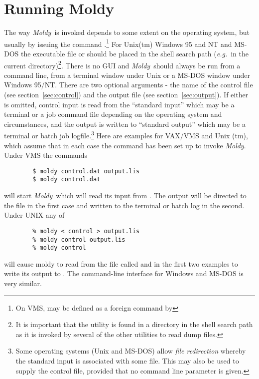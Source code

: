\documentclass[a4paper,twoside]{report}
\newcommand{\moldy}{\emph{Moldy}}
\newcommand{\eg}{\emph{e.g.}}
\begin{document}
\chapter{Running Moldy}  %

The way \moldy\ is invoked depends to some extent on the operating
system, but usually by issuing the command .\footnote{On
  VMS,  may be defined as a foreign command by } For Unix(tm) Windows 95 and NT
and MS-DOS the executable file  or 
should be placed in the shell search path (\eg\ in the current
directory)\footnote{It is important that the  utility
  is found in a directory in the shell search path as it is invoked by
  several of the other utilities to read dump files.}. There is no GUI
and \moldy\ should always be run from a command line, from a terminal
window under Unix or a MS-DOS window under Windows 95/NT.  There are
two optional arguments - the name of the control file (see
section~\ref{sec:control}) and the output file (see
section~\ref{sec:output}).  If either is omitted, control input is
read from the ``standard input'' which may be a terminal or a job
command file depending on the operating system and circumstances, and
the output is written to ``standard output'' which may be a terminal
or batch job logfile.\footnote{Some operating systems (Unix and
  MS-DOS) allow \emph{file redirection} whereby the standard input is
  associated with some file.  This may also be used to supply the
  control file, provided that no command line parameter is given.}
Here are examples for VAX/VMS and Unix (tm), which assume that in each
case the command has been set up to invoke \moldy.  Under VMS the
commands
\begin{verbatim}
        $ moldy control.dat output.lis
        $ moldy control.dat
\end{verbatim}
will start \moldy\  which will read its input from .
The output will be directed to the file  in the first
case and written to the terminal or batch log in the second.  Under
UNIX any of
\begin{verbatim}
        % moldy < control > output.lis
        % moldy control output.lis
        % moldy control
\end{verbatim}
will cause moldy to read from the file called  and in
the first two examples to write its output to .  The
command-line interface for Windows and MS-DOS is very similar. 
\end{document}
